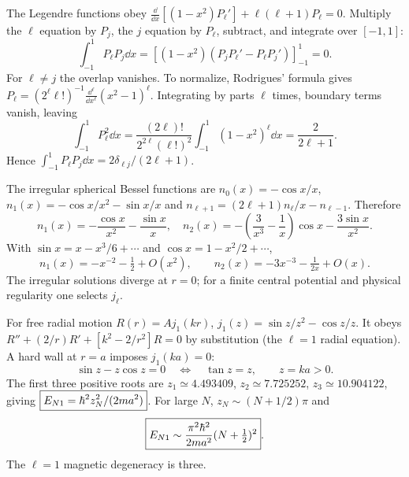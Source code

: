 The Legendre functions obey
$\frac{\dd}{\dd x}[(1-x^2)P_\ell']
+\ell(\ell+1)P_\ell=0$.
Multiply the $\ell$ equation by $P_j$,
the $j$ equation by $P_\ell$, subtract,
and integrate over $[-1,1]$:
\begin{equation}
[\ell(\ell+1)-j(j+1)]
\int_{-1}^1P_\ell P_j\dd x
=\left[(1-x^2)(P_jP_\ell'-P_\ell P_j')\right]_{-1}^1=0.
\end{equation}
For $\ell\ne j$ the overlap vanishes.
To normalize, Rodrigues' formula gives
$P_\ell=(2^\ell\ell!)^{-1}\frac{\dd^\ell}{\dd x^\ell}
(x^2-1)^\ell$. Integrating by parts $\ell$
times, boundary terms vanish, leaving
\begin{equation}
\int_{-1}^1P_\ell^2\dd x
=\frac{(2\ell)!}{2^{2\ell}(\ell!)^2}
\int_{-1}^1(1-x^2)^\ell\dd x
=\frac{2}{2\ell+1}.
\end{equation}
Hence
$\boxed{\int_{-1}^1P_\ell P_j\dd x=
2\delta_{\ell j}/(2\ell+1)}$.

The irregular spherical Bessel functions
are $n_0(x)=-\cos x/x$, $n_1(x)=-\cos x/x^2-\sin x/x$
and $n_{\ell+1}=(2\ell+1)n_\ell/x-n_{\ell-1}$.
Therefore
\begin{equation}
\boxed{n_1(x)=-\frac{\cos x}{x^2}
-\frac{\sin x}{x},\quad
n_2(x)=
-\left(\frac3{x^3}-\frac1x\right)\cos x
-\frac{3\sin x}{x^2}}.
\end{equation}
With $\sin x=x-x^3/6+\cdots$ and
$\cos x=1-x^2/2+\cdots$,
\begin{equation}
\boxed{n_1(x)=-x^{-2}-\tfrac12+O(x^2),\qquad
n_2(x)=-3x^{-3}-\tfrac1{2x}+O(x)}.
\end{equation}
The irregular solutions diverge at $r=0$;
for a finite central potential and
physical regularity one selects $j_\ell$.

For free radial motion $R(r)=Aj_1(kr)$,
$j_1(z)=\sin z/z^2-\cos z/z$.
It obeys $R''+(2/r)R'+[k^2-2/r^2]R=0$
by substitution (the $\ell=1$ radial equation).
A hard wall at $r=a$ imposes $j_1(ka)=0$:
\begin{equation}
\sin z-z\cos z=0
\quad\Longleftrightarrow\quad
\boxed{\tan z=z},\qquad z=ka>0.
\end{equation}
The first three positive roots are
$z_1\simeq4.493409$, $z_2\simeq7.725252$,
$z_3\simeq10.904122$, giving
$\boxed{E_{N1}=\hbar^2 z_N^2/(2ma^2)}$.
For large $N$, $z_N\sim(N+1/2)\pi$ and
\begin{equation}
\boxed{E_{N1}\sim\frac{\pi^2\hbar^2}{2ma^2}
(N+\tfrac12)^2}.
\end{equation}
The $\ell=1$ magnetic degeneracy is three.

